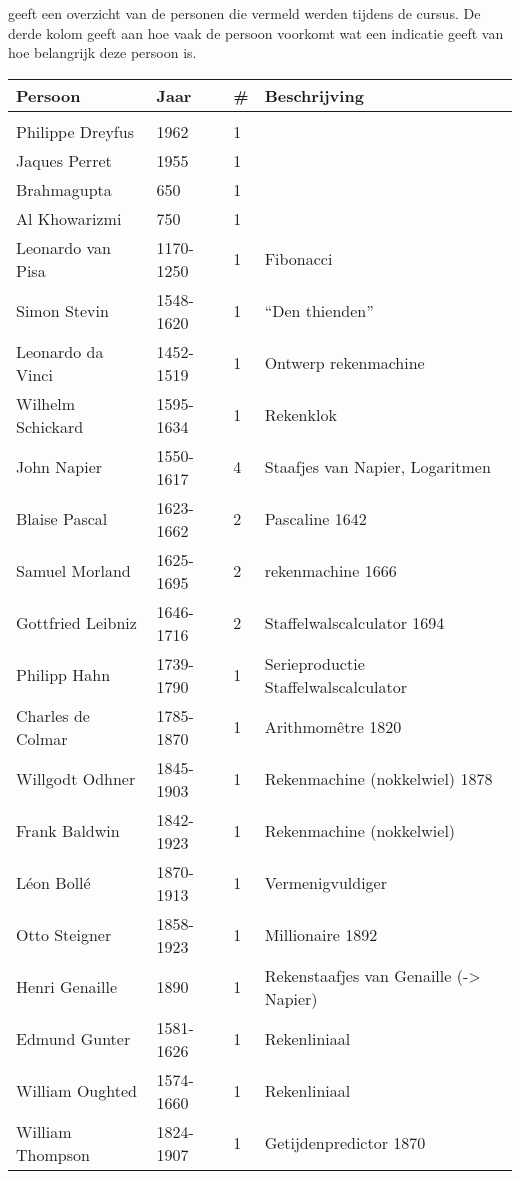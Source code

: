 \documentclass[../main.tex]{subfiles}
\begin{document}
 geeft een overzicht van de personen die vermeld werden tijdens de cursus. De derde kolom geeft aan hoe vaak de persoon voorkomt wat een indicatie geeft van hoe belangrijk deze persoon is.


\begin{longtable}{llll}
\toprule
Persoon	& Jaar	& \#	& Beschrijving \\
\midrule
\endhead
\bottomrule
\endfoot
\bottomrule
\endlastfoot
\label{table:personen}\\
Philippe Dreyfus		&	1962		&	1		&	\\
Jaques Perret			&	1955		&	1		&	\\
Brahmagupta				&	650			&	1		&	\\
Al Khowarizmi			&	750			&	1		&	\\
Leonardo van Pisa		&	1170-1250	&	1		&	Fibonacci	\\
Simon Stevin			&	1548-1620	&	1		&	``Den thienden''	\\
Leonardo da Vinci		&	1452-1519	&	1		&	Ontwerp rekenmachine	\\
Wilhelm Schickard		&	1595-1634	&	1		&	Rekenklok	\\
John Napier				&	1550-1617	&	4		&	Staafjes van Napier, Logaritmen	\\
Blaise Pascal			&	1623-1662	&	2		&	Pascaline 1642	\\
Samuel Morland			&	1625-1695	&	2		&	rekenmachine 1666	\\
Gottfried Leibniz		&	1646-1716	&	2		&	Staffelwalscalculator 1694	\\
Philipp Hahn			&	1739-1790	&	1		&	Serieproductie Staffelwalscalculator	\\
Charles de Colmar		&	1785-1870	&	1		&	Arithmomêtre 1820	\\
Willgodt Odhner			&	1845-1903	&	1		&	Rekenmachine (nokkelwiel) 1878	\\
Frank Baldwin			&	1842-1923	&	1		&	Rekenmachine (nokkelwiel)	\\
Léon Bollé				&	1870-1913	&	1		&	Vermenigvuldiger	\\
Otto Steigner			&	1858-1923	&	1		&	Millionaire 1892	\\
Henri Genaille			&	1890		&	1		&	Rekenstaafjes van Genaille (-> Napier)	\\
Edmund Gunter			&	1581-1626	&	1		&	Rekenliniaal	\\
William Oughted			&	1574-1660	&	1		&	Rekenliniaal	\\
William Thompson		&	1824-1907	&	1		&	Getijdenpredictor 1870	\\

\end{longtable}
\end{document}
